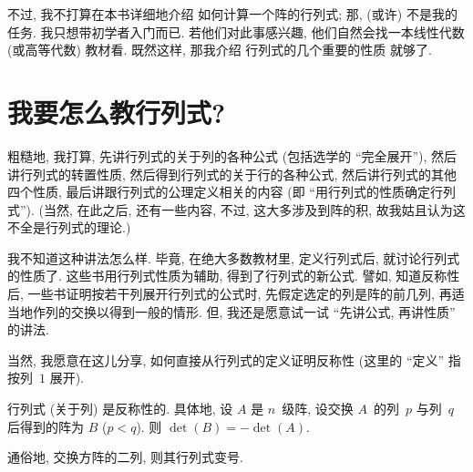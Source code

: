 \documentclass[%
    UTF8,%
    fontset=none,%
    punct=kaiming,%
    zihao=-4,%
    a4paper,%
    oneside,%
]{ctexbook}
\begin{document}
不过, 我不打算在本书详细地介绍%
如何计算一个阵的行列式;
那, (或许) 不是我的任务.
我只想带初学者入门而已.
若他们对此事感兴趣,
他们自然会找一本线性代数 (或高等代数)
教材看.
既然这样, 那我介绍%
行列式的几个重要的性质%
就够了.

\section{我要怎么教行列式?}

粗糙地, 我打算, 先讲行列式的关于列的各种公式
(包括选学的 ``完全展开''),
然后讲行列式的转置性质,
然后得到行列式的关于行的各种公式,
然后讲行列式的其他四个性质,
最后讲跟行列式的公理定义相关的内容
(即 ``用行列式的性质确定行列式'').
(当然, 在此之后, 还有一些内容,
不过, 这大多涉及到阵的积,
故我姑且认为这不全是行列式的理论.)

我不知道这种讲法怎么样.
毕竟, 在绝大多数教材里,
定义行列式后,
就讨论行列式的性质了.
这些书用行列式性质为辅助,
得到了行列式的新公式.
譬如, 知道反称性后,
一些书证明按若干列展开行列式的公式时,
先假定选定的列是阵的前几列,
再适当地作列的交换以得到一般的情形.
但, 我还是愿意试一试
``先讲公式, 再讲性质'' 的讲法.

当然, 我愿意在这儿分享,
如何直接从行列式的定义证明反称性
(这里的 ``定义'' 指按列~\(1\) 展开).

\begin{theorem}
    行列式 (关于列) 是反称性的.
    具体地,
    设 \(A\) 是 \(n\)~级阵,
    设交换 \(A\)~的列~\(p\) 与列~\(q\) 后得到的阵为 \(B\)
    (\(p < q\)).
    则 \(\det {(B)} = -\det {(A)}\).

    通俗地, 交换方阵的二列, 则其行列式变号.
\end{theorem}
\end{document}
